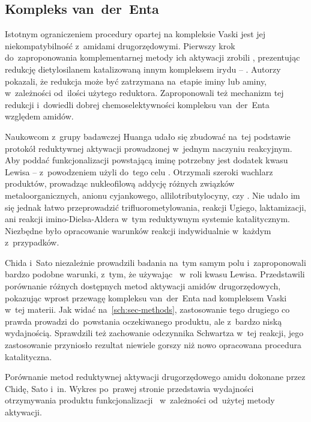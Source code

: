 \subsection{Kompleks van~der~Enta}\label{literature:new:van-der-ent}
Istotnym ograniczeniem procedury opartej na kompleksie Vaski jest jej niekompatybilność z~amidami
  drugorzędowymi.
Pierwszy krok do~zaproponowania komplementarnej metody ich aktywacji zrobili \citeauthor{cheng12},
  prezentując redukcję dietylosilanem katalizowaną innym kompleksem irydu \---
  .
Autorzy pokazali, że redukcja może być zatrzymana na~etapie iminy lub aminy, w~zależności
  od~ilości użytego reduktora.
Zaproponowali też mechanizm tej redukcji i~dowiedli dobrej chemoselektywności kompleksu
  van~der~Enta względem amidów.

Naukowcom z~grupy badawczej Huanga udało się zbudować na~tej podstawie protokół reduktywnej
  aktywacji prowadzonej w~jednym naczyniu reakcyjnym.
Aby poddać funkcjonalizacji powstającą iminę potrzebny jest dodatek kwasu Lewisa \---
  \citeauthor{ou18} z~powodzeniem użyli do~tego celu .
Otrzymali szeroki wachlarz produktów, prowadząc nukleofilową addycję różnych związków
  metaloorganicznych, anionu cyjankowego, allilotributylocyny, czy .
Nie udało im się jednak łatwo przeprowadzić trifluorometylowania, reakcji Ugiego, laktamizacji,
  ani reakcji imino-Dielsa-Aldera w~tym reduktywnym systemie katalitycznym.
Niezbędne było opracowanie warunków reakcji indywidualnie w~każdym z~przypadków.

Chida i~Sato niezależnie prowadzili badania na~tym samym polu i~zaproponowali bardzo podobne
  warunki, z~tym, że używając~ w~roli kwasu Lewisa.
Przedstawili porównanie różnych dostępnych metod aktywacji amidów drugorzędowych,
  pokazując wprost przewagę kompleksu van~der~Enta nad kompleksem Vaski w~tej materii.
Jak widać na~\cref{sch:sec-methods}, zastosowanie tego drugiego co prawda prowadzi
  do~powstania oczekiwanego produktu, ale z~bardzo niską wydajnością.
Sprawdzili też zachowanie odczynnika Schwartza w~tej reakcji, jego zastosowanie przyniosło
  rezultat niewiele gorszy niż nowo opracowana procedura katalityczna.
\begin{scheme*}
  
  \caption{
    Porównanie metod reduktywnej aktywacji drugorzędowego amidu dokonane przez Chidę, Sato i~in.
    Wykres po~prawej stronie przedstawia wydajności otrzymywania produktu
      funkcjonalizacji~ w~zależności od~użytej metody aktywacji.
  }
  \label{sch:sec-methods}
\end{scheme*}

